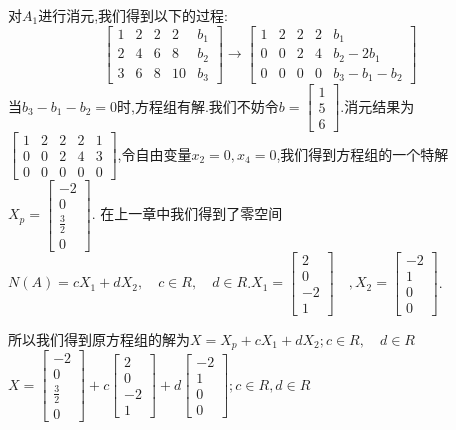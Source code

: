 \documentclass[oneside]{book}
\begin{document}
	对$A_{1}$进行消元,我们得到以下的过程:
	$$\left[\begin{array}{ccccc}
		1&2&2&2&b_{1}\\2&4&6&8&b_{2}\\3&6&8&10&b_{3}
	\end{array}\right]\rightarrow \left[\begin{array}{ccccc}
	1&2&2&2&b_{1}\\0&0&2&4&b_{2}-2b_{1}\\0&0&0&0&b_{3}-b_{1}-b_{2}
\end{array}\right]$$
	当$b_{3}-b_{1}-b_{2}=0$时,方程组有解.我们不妨令$b=\left[\begin{array}{c}
		1\\5\\6
	\end{array}\right]$.消元结果为$\left[\begin{array}{ccccc}
	1&2&2&2&1\\0&0&2&4&3\\0&0&0&0&0
\end{array}\right]$,令自由变量$x_{2}=0,x_{4}=0$,我们得到方程组的一个特解$X_{p}=\left[\begin{array}{c}
-2\\0\\\frac{3}{2}\\0
\end{array}\right]$.
在上一章中我们得到了零空间$N(A)=cX_{1}+dX_{2} ,\quad c\in R, \quad d\in R$.$X_{1}=\left[\begin{array}{c}
	2\\0\\-2\\1
\end{array}\right]\quad, X_{2}=\left[\begin{array}{c}
	-2\\1\\0\\0
\end{array}\right]$.

所以我们得到原方程组的解为$X=X_{p}+cX_{1}+dX_{2};c\in R,\quad d\in R$
$X=\left[\begin{array}{c}
	-2\\0\\\frac{3}{2}\\0
\end{array}\right]+c\left[\begin{array}{c}
2\\0\\-2\\1
\end{array}\right]+d\left[\begin{array}{c}
-2\\1\\0\\0
\end{array}\right];c\in R,d\in R$
\end{document}
